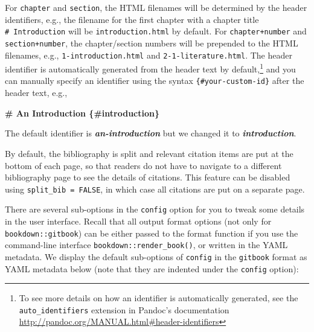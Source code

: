 \documentclass[
  12pt,
]{krantz}
\newenvironment{Shaded}{\begin{snugshade}}{\end{snugshade}}
\newcommand{\FunctionTok}[1]{\textcolor[rgb]{0.13,0.29,0.53}{\textbf{#1}}}
\newcommand{\InformationTok}[1]{\textcolor[rgb]{0.56,0.35,0.01}{\textbf{\textit{#1}}}}
\newcommand{\NormalTok}[1]{#1}
\theoremstyle{definition}
\theoremstyle{definition}
\theoremstyle{definition}
\theoremstyle{definition}
\theoremstyle{remark}
\begin{document}
For \texttt{chapter} and \texttt{section}, the HTML filenames will be determined by the header identifiers, e.g., the filename for the first chapter with a chapter title \texttt{\#\ Introduction} will be \texttt{introduction.html} by default. For \texttt{chapter+number} and \texttt{section+number}, the chapter/section numbers will be prepended to the HTML filenames, e.g., \texttt{1-introduction.html} and \texttt{2-1-literature.html}. The header identifier is automatically generated from the header text by default,\footnote{To see more details on how an identifier is automatically generated, see the \texttt{auto\_identifiers} extension in Pandoc's documentation \url{http://pandoc.org/MANUAL.html\#header-identifiers}} and you can manually specify an identifier using the syntax \texttt{\{\#your-custom-id\}} after the header text, e.g.,

\begin{Shaded}
\begin{Highlighting}[]
\FunctionTok{\# An Introduction \{\#introduction\}}

\NormalTok{The default identifier is }\InformationTok{\textasciigrave{}an{-}introduction\textasciigrave{}}\NormalTok{ but we changed}
\NormalTok{it to }\InformationTok{\textasciigrave{}introduction\textasciigrave{}}\NormalTok{.}
\end{Highlighting}
\end{Shaded}

By default, the bibliography is split and relevant citation items are put at the bottom of each page, so that readers do not have to navigate to a different bibliography page to see the details of citations. This feature can be disabled using \texttt{split\_bib\ =\ FALSE}, in which case all citations are put on a separate page.

There are several sub-options in the \texttt{config} option for you to tweak some details in the user interface. Recall that all output format options (not only for \texttt{bookdown::gitbook}) can be either passed to the format function if you use the command-line interface \texttt{bookdown::render\_book()}, or written in the YAML metadata. We display the default sub-options of \texttt{config} in the \texttt{gitbook} format as YAML metadata below (note that they are indented under the \texttt{config} option):
\end{document}
